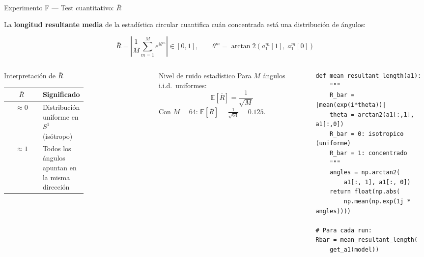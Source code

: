 \documentclass[10pt]{beamer}
\begin{document}
\begin{frame}[fragile]{Experimento F — Test cuantitativo: $\bar{R}$}

La \textbf{longitud resultante media} de la estadística circular cuantifica cuán concentrada está una distribución de ángulos:

\[
  \bar{R} = \left|\frac{1}{M}\sum_{m=1}^{M} e^{i\theta^m}\right| \in [0,1],
  \qquad \theta^m = \arctan2\!\left(a_1^m[1],\; a_1^m[0]\right)
\]

\begin{columns}
\begin{block}{Interpretación de $\bar{R}$}
  \begin{tabular}{cp{0.55\linewidth}}
    \toprule
    $\bar{R}$ & Significado \\
    \midrule
    $\approx 0$ & Distribución uniforme en $S^1$ (isótropo) \\
    $\approx 1$ & Todos los ángulos apuntan en la misma dirección \\
    \bottomrule
  \end{tabular}
\end{block}

\medskip
\begin{alertblock}{Nivel de ruido estadístico}
  Para $M$ ángulos i.i.d.\ uniformes:
  \[
    \mathbb{E}[\bar{R}] = \frac{1}{\sqrt{M}}
  \]
  Con $M=64$: $\mathbb{E}[\bar{R}] = \frac{1}{\sqrt{64}} = \mathbf{0.125}$.
\end{alertblock}

\begin{lstlisting}[style=python]
def mean_resultant_length(a1):
    """
    R_bar = |mean(exp(i*theta))|
    theta = arctan2(a1[:,1], a1[:,0])
    R_bar = 0: isotropico (uniforme)
    R_bar = 1: concentrado
    """
    angles = np.arctan2(
        a1[:, 1], a1[:, 0])
    return float(np.abs(
        np.mean(np.exp(1j * angles))))

# Para cada run:
Rbar = mean_resultant_length(
    get_a1(model))
\end{lstlisting}
\end{columns}

\end{frame}
\end{document}
